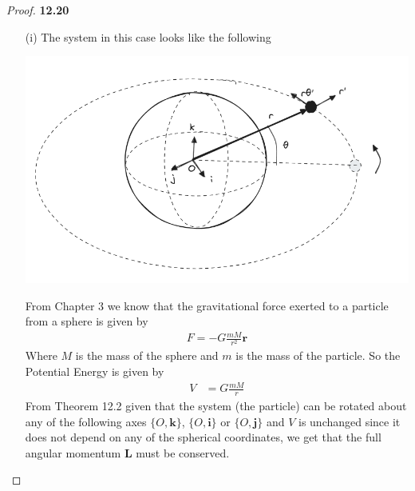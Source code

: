 \documentclass[11pt]{article}
\theoremstyle{definition}
\begin{document}
\begin{proof}{\textbf{12.20}}
    \begin{itemize}
    \item [(i)]
    The system in this case looks like the following
    \begin{center}
        \includegraphics[scale=0.4]{ch12-20-i.png}
    \end{center}
    From Chapter 3 we know that the gravitational force exerted to a particle
    from a sphere is given by
    \begin{align*}
        F = -G\frac{mM}{r^2}\bm{r}
    \end{align*}
    Where $M$ is the mass of the sphere and $m$ is the mass of the particle.
    So the Potential Energy is given by 
    \begin{align*}
        V &= G\frac{mM}{r}
    \end{align*}
    From Theorem 12.2 given that the system (the particle) can be
    rotated about any of the following axes $\{O,\bm{k}\}$, $\{O,\bm{i}\}$ or
    $\{O,\bm{j}\}$ and $V$ is unchanged since it does not depend on any
    of the spherical coordinates, we get that the full angular momentum
    $\bm{L}$ must be conserved.


\end{itemize}
\end{proof}
\end{document}
